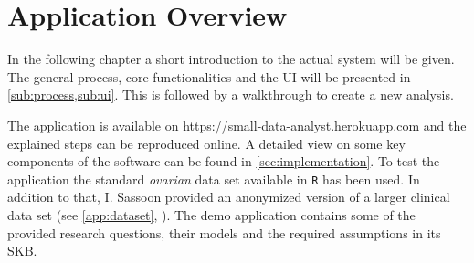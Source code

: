 \section{Application Overview}
\label{sec:app}
In the following chapter a short introduction to the actual system will be given. The general process, core functionalities and the \gls{UI} will be presented in \cref{sub:process,sub:ui}. This is followed by a walkthrough to create a new analysis. 

The application is available on \href{https://small-data-analyst.herokuapp.com}{https://small-data-analyst.herokuapp.com} and the explained steps can be reproduced online. A detailed view on some key components of the software can be found in \autoref{sec:implementation}. To test the application the standard \textit{ovarian} data set available in \texttt{R} has been used. In addition to that, I. Sassoon provided an anonymized version of a larger clinical data set (see \autoref{app:dataset}, ). The demo application contains some of the provided research questions, their models and the required assumptions in its \gls{SKB}.










